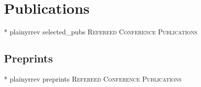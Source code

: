 \documentclass[10pt,a4paper,sans]{moderncv} %
\begin{document}
\section{Publications}

\nocite{selected_pubs}{*}
{plainyrrev}
{selected_pubs}
{\large \textsc{Refereed Conference Publications}}



\subsection{Preprints}
\nocite{preprints}{*}
{plainyrrev}
{preprints}
{\large \textsc{Refereed Conference Publications}}



\end{document}
